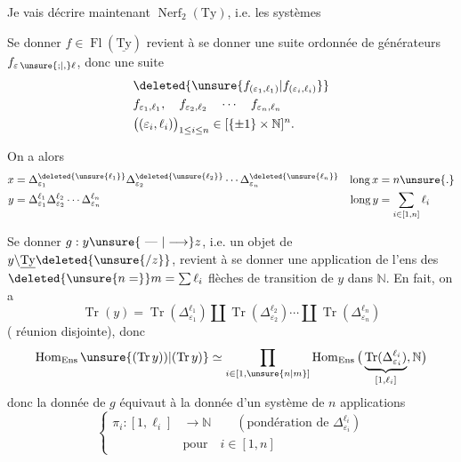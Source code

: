 Je vais décrire maintenant $\operatorname{Nerf}_2(\mathrm{Ty})$, i.e. les  systèmes


Se donner $f\in\operatorname{Fl}(\underline{\mathrm{Ty}})$ revient à se donner une suite ordonnée de générateurs $f_{\varepsilon\,\unsure{;|,}\ell}$, donc une suite
\[
\begin{aligned}
&\deleted{\unsure{f_{(\varepsilon_1,\ell_1)}|f_{(\varepsilon_i,\ell_i)}}}\\
&f_{\varepsilon_1,\ell_1},\quad f_{\varepsilon_2,\ell_2}\quad\cdots\quad f_{\varepsilon_n,\ell_n}\\
&\big((\varepsilon_i,\ell_i)\big)_{1\leq i\leq n}\in[\{\pm1\}\times\mathbb N]^n.
\end{aligned}
\]

On a alors
\[
\begin{aligned}
x&=\Delta_{\varepsilon_1}^{\deleted{\unsure{\ell_1}}}\Delta_{\varepsilon_2}^{\deleted{\unsure{\ell_2}}}\cdots\Delta_{\varepsilon_n}^{\deleted{\unsure{\ell_n}}}&\operatorname{long}x&=n\unsure{.}\\
y&=\Delta_{\varepsilon_1}^{\ell_1}\Delta_{\varepsilon_2}^{\ell_2}\cdots\Delta_{\varepsilon_n}^{\ell_n}&\operatorname{long}y&=\sum_{i\in[1,n]}\ell_i
\end{aligned}
\]

Se donner $g:y\unsure{\text{ --- }|\longrightarrow}z$, i.e. un objet de $y\backslash\underline{\mathrm{Ty}}\deleted{\unsure{/z}}$, revient à se donner une application de l'ens des $\deleted{\unsure{n=}}m=\sum\ell_i$ flèches de transition de $y$ dans $\mathbb N$. En fait, on a
\[
\operatorname{Tr}(y)=\operatorname{Tr}(\Delta_{\varepsilon_1}^{\ell_1})\amalg
\operatorname{Tr}(\Delta_{\varepsilon_2}^{\ell_2})\cdots\amalg\operatorname{Tr}(\Delta_{\varepsilon_n}^{\ell_n})
\]
( réunion disjointe), donc
\[
\operatorname{Hom}_{\mathrm{Ens}}\unsure{(\operatorname{Tr}y))|(\operatorname{Tr}y)}
\simeq\prod_{i\in[1,\unsure{n|m}]}\operatorname{Hom}_{\mathrm{Ens}}
 \big(\underbrace{\operatorname{Tr}(\Delta_{\varepsilon_i}^{\ell_i})}_{[1,\ell_i]},\mathbb N\big)
\]
donc la donnée de $g$ équivaut à la donnée d'un système de $n$ applications
\[
\left\{\begin{aligned}
\pi_i:[1,\ell_i]&\longrightarrow\mathbb N\qquad(\text{pondération de }\Delta_{\varepsilon_i}^{\ell_i})\\
&\text{pour}\quad i\in[1,n]
\end{aligned}\right.
\]

